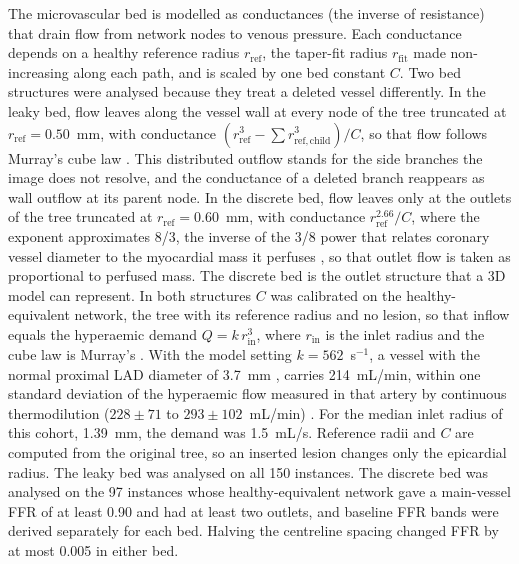 \documentclass[journal]{IEEEtran}
\begin{document}
The microvascular bed is modelled as conductances (the inverse of resistance) that drain flow from network nodes to
venous pressure. Each conductance depends on a healthy reference radius $r_\mathrm{ref}$, the taper-fit radius
$r_\mathrm{fit}$ made non-increasing along each path, and is scaled by one bed constant $C$. Two bed structures were analysed because they treat a deleted vessel differently. In the leaky
bed, flow leaves along the vessel wall at every node of the tree truncated at $r_\mathrm{ref} = 0.50$~mm, with
conductance $(r_\mathrm{ref}^3 - \sum r_{\mathrm{ref},\mathrm{child}}^3)/C$, so that flow follows Murray's cube law
\cite{murray1926}. This distributed outflow stands for the side branches the image does not resolve, and the
conductance of a deleted branch reappears as wall outflow at its parent node. In the discrete bed, flow leaves only
at the outlets of the tree truncated at $r_\mathrm{ref} = 0.60$~mm, with conductance $r_\mathrm{ref}^{2.66}/C$,
where the exponent approximates 8/3, the inverse of the 3/8 power that relates coronary vessel diameter to the
myocardial mass it perfuses \cite{choy2008}, so that outlet flow is taken as proportional to perfused mass. The discrete bed is the outlet structure that a 3D model can
represent. In both structures $C$ was calibrated on the healthy-equivalent network, the tree with its reference
radius and no lesion, so that inflow equals the hyperaemic demand $Q = k\,r_\mathrm{in}^3$, where $r_\mathrm{in}$ is
the inlet radius and the cube law is Murray's \cite{murray1926}. With the model setting $k = 562$~s$^{-1}$, a
vessel with the normal proximal LAD diameter of 3.7~mm \cite{dodge1992}, carries 214~mL/min,
within one standard deviation of the hyperaemic flow measured in that artery by continuous thermodilution
($228 \pm 71$ to $293 \pm 102$~mL/min) \cite{fournier2021}. For the median inlet radius of this cohort, 1.39~mm, the
demand was 1.5~mL/s. Reference radii and $C$ are computed from the original tree, so an inserted lesion changes
only the epicardial radius. The leaky bed was analysed on all 150 instances. The discrete bed was analysed on the
97 instances whose healthy-equivalent network gave a main-vessel FFR of at least 0.90 and had at least two outlets,
and baseline FFR bands were derived separately for each bed. Halving the centreline spacing changed FFR by at most
0.005 in either bed.
\end{document}
